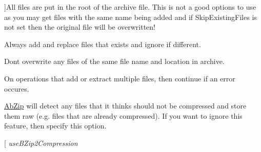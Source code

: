 \begin{Desc}
\begin{description}
{}]All files are put in the root of the archive file. This is not a good options to use as you may get files with the same name being added and if Skip\+Existing\+Files is not set then the original file will be overwritten! \item[{\em 
Add\+Replace\+Files\hypertarget{class_ab_zip_a9c4f57d6b8d9a449c2eb6c4d4e53c9d5a1fcbc789293975fb30038ef333269744}{}\label{class_ab_zip_a9c4f57d6b8d9a449c2eb6c4d4e53c9d5a1fcbc789293975fb30038ef333269744}
}]Always add and replace files that exists and ignore if different. \item[{\em 
Skip\+Existing\+Files\hypertarget{class_ab_zip_a9c4f57d6b8d9a449c2eb6c4d4e53c9d5a19424543923204da4ee787ecacd9209b}{}\label{class_ab_zip_a9c4f57d6b8d9a449c2eb6c4d4e53c9d5a19424543923204da4ee787ecacd9209b}
}]Don\textquotesingle{}t overwrite any files of the same file name and location in archive. \item[{\em 
Continue\+On\+Error\hypertarget{class_ab_zip_a9c4f57d6b8d9a449c2eb6c4d4e53c9d5a8da32dae1589f05f6e1eaf2a77353542}{}\label{class_ab_zip_a9c4f57d6b8d9a449c2eb6c4d4e53c9d5a8da32dae1589f05f6e1eaf2a77353542}
}]On operations that add or extract multiple files, then continue if an error occures. \item[{\em 
Ignore\+Store\+Only\+Checks\hypertarget{class_ab_zip_a9c4f57d6b8d9a449c2eb6c4d4e53c9d5ade267877085e03c98076fe12ce440440}{}\label{class_ab_zip_a9c4f57d6b8d9a449c2eb6c4d4e53c9d5ade267877085e03c98076fe12ce440440}
}]\hyperlink{class_ab_zip}{Ab\+Zip} will detect any files that it thinks should not be compressed and store them raw (e.\+g. files that are already compressed). If you want to ignore this feature, then specify this option. \item[{\em 
use\+B\+Zip2\+Compression\hypertarget{class_ab_zip_a9c4f57d6b8d9a449c2eb6c4d4e53c9d5a58109d8c41d7075deeba22c6600feec1}{}\label{class_ab_zip_a9c4f57d6b8d9a449c2eb6c4d4e53c9d5a58109d8c41d7075deeba22c6600feec1}
}
\end{description}
\end{Desc}
